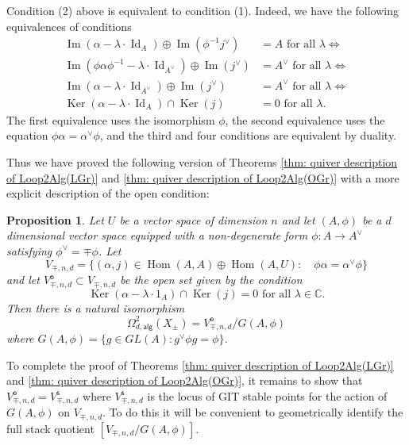 \documentclass{amsart}
\newtheorem{proposition}[theorem]{Proposition}
\theoremstyle{definition}
\newcommand{\CC} {{\mathbb C}}          %
\newcommand{\Hom}{\operatorname{Hom}}
\newcommand{\Ker}{\operatorname{Ker}}
\newcommand{\im}{\operatorname{Im}}
\newcommand{\alg}{\mathsf{alg}}
\newcommand{\open}{\mathsf{o}}
\newcommand{\stable}{\mathsf{s}}
\newcommand{\LoopTwo}{\Omega^{2}_{d,\alg}}
\newcommand{\Id}{\operatorname{Id}}
\newcommand{\Xpm}{X_{\pm}}
\begin{document}
\bigskip

Condition (2) above is equivalent to condition (1). Indeed, we have
the following equivalences of conditions
\begin{align*}
\im (\alpha -\lambda \cdot \Id_{A})\oplus  \im (\phi^{-1}j^{\vee} )&=A
\text{ for all } \lambda \iff \\
\im (\phi \alpha\phi^{-1} -\lambda \cdot \Id_{A^{\vee }})\oplus  \im
(j^{\vee} )&=A^{\vee }
\text{ for all } \lambda \iff \\
\im (\alpha -\lambda \cdot \Id_{A^{\vee }})\oplus  \im
(j^{\vee} )&=A^{\vee }
\text{ for all } \lambda \iff \\
\Ker (\alpha -\lambda \cdot \Id_{A})\cap \Ker (j) &= 0 \text{ for all } \lambda .
\end{align*}
The first equivalence uses the isomorphism $\phi$, the second
equivalence uses the equation $\phi \alpha  = \alpha^{\vee}\phi$, and
the third and four conditions are equivalent by duality.

Thus we have proved the following version of Theorems \ref{thm: quiver
description of Loop2Alg(LGr)} and \ref{thm: quiver description of
Loop2Alg(OGr)} with a more explicit description of the open condition:
\begin{proposition}\label{prop: quiver description of Loop2Alg(Xpm)
with explicit open condition}
Let $U$ be a vector space of dimension $n$ and let $(A,\phi )$ be a
$d$ dimensional vector space equipped with a non-degenerate form $\phi
:A\to A^{\vee}$ satisfying $\phi^{\vee}=\mp \phi$. Let
\[
V_{\mp ,n,d} = \{(\alpha ,j)\in \Hom (A,A)\oplus \Hom (A,U):\quad \phi
\alpha =\alpha^{\vee}\phi \}
\]
and let $V^{\open}_{\mp ,n,d}\subset V_{\mp ,n,d}$ be the open set given
by the condition
\[
\Ker (\alpha -\lambda \cdot 1_{A})\cap \Ker (j) = 0\text{ for all } \lambda \in \CC .
\]
Then there is a natural isomorphism
\[
\LoopTwo (\Xpm ) = V^{\open}_{\mp ,n,d}/G(A,\phi )
\]
where $G(A,\phi ) = \{g\in GL(A): g^{\vee}\phi g = \phi \}$. 
\end{proposition}

To complete the proof of Theorems \ref{thm: quiver description of
Loop2Alg(LGr)} and \ref{thm: quiver description of Loop2Alg(OGr)}, it
remains to show that $V^{\open}_{\mp ,n,d} = V^{\stable }_{\mp ,n,d}$
where $V^{\stable }_{\mp ,n,d}$ is the locus of GIT stable points for
the action of $G(A,\phi )$ on $V_{\mp ,n,d}$. To do this it will be
convenient to geometrically identify the full stack quotient $[V_{\mp
,n,d} / G(A,\phi )]$.
\end{document}
